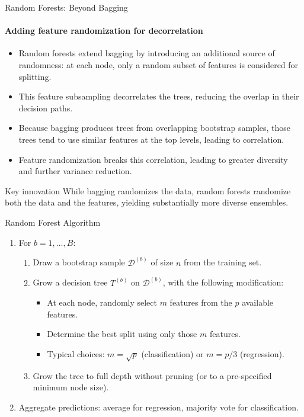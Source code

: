 \begin{frame}{Random Forests: Beyond Bagging}
  \framesubtitle{Adding feature randomization for decorrelation}
  \begin{itemize}
    \item \alert{Random forests} extend bagging by introducing an additional source of randomness:
          at each node, only a \alert{random subset of features} is considered for splitting.
    \item This feature subsampling decorrelates the trees, reducing the overlap in their
          decision paths.
    \item Because bagging produces trees from overlapping bootstrap samples, those trees tend
          to use similar features at the top levels, leading to \alert{correlation}.
    \item Feature randomization breaks this correlation, leading to greater diversity and
          further variance reduction.
  \end{itemize}
  \begin{block}{Key innovation}
    While bagging randomizes the \alert{data}, random forests randomize both the \alert{data}
    and the \alert{features}, yielding substantially more diverse ensembles.
  \end{block}
\end{frame}

\begin{frame}{Random Forest Algorithm}
  \begin{enumerate}
    \item For $b = 1, \ldots, B$:
      \begin{enumerate}
        \item Draw a bootstrap sample $\mathcal{D}^{(b)}$ of size $n$ from the training set.
        \item Grow a decision tree $T^{(b)}$ on $\mathcal{D}^{(b)}$, with the following
              modification:
              \begin{itemize}
                \item At each node, randomly select $m$ features from the $p$ available features.
                \item Determine the best split using \alert{only those $m$ features}.
                \item Typical choices: $m = \sqrt{p}$ (classification) or $m = p/3$ (regression).
              \end{itemize}
        \item Grow the tree to full depth without pruning (or to a pre-specified minimum
              node size).
      \end{enumerate}
    \item Aggregate predictions: average for regression, majority vote for classification.
  \end{enumerate}
\end{frame}

